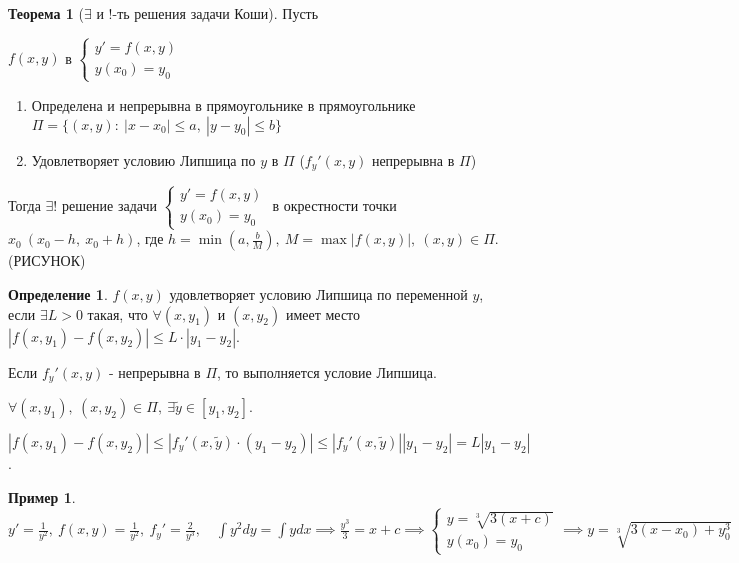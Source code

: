 \documentclass{report}
\theoremstyle{definition}
\newtheorem{definition}{Определение}[section]
\newtheorem{example}{Пример}
\newtheorem{theorem}{Теорема}[section]
\begin{document}
\begin{theorem}[$\exists$ и $!$-ть решения задачи Коши]
    Пусть
    \begin{center}
        $f(x,y)$ в $\left\{\begin{array}{l}
                y'=f(x,y) \\
                y(x_0) = y_0
            \end{array}\right.$
    \end{center}

    \begin{enumerate}
        \item Определена и непрерывна в прямоугольнике в прямоугольнике \\
              $\Pi = \{(x,y): \ |x - x_0| \leqslant a, \ |y - y_0| \leqslant b\}$
        \item Удовлетворяет условию Липшица по $y$ в $\Pi$ ($f_y'(x,y)$ непрерывна в $\Pi$)
    \end{enumerate}

    Тогда $\exists !$ решение задачи $\left\{\begin{array}{l}
            y'=f(x,y) \\
            y(x_0) = y_0
        \end{array}\right.$ в окрестности точки \\
    $x_0 \ (x_0 - h, \ x_0 + h)$, где $h = \min(a, \frac{b}{M}), \ M = \max|f(x,y)|, \ (x,y) \in \Pi$. (РИСУНОК)
\end{theorem}

\begin{definition}
    $f(x,y)$ удовлетворяет условию Липшица по переменной $y$, если $\exists L > 0$ такая, что $\forall (x,y_1)$ и $(x,y_2)$ имеет место $|f(x,y_1) - f(x,y_2)| \leqslant L \cdot|y_1 - y_2|$.

    Если $f_y'(x,y)$ - непрерывна в $\Pi$, то выполняется условие Липшица.

    $\forall (x,y_1), \ (x,y_2) \in \Pi, \ \exists \widetilde{y} \in [y_1,y_2]$.

    $|f(x,y_1) - f(x,y_2)| \leqslant |f_y'(x,\widetilde{y}) \cdot (y_1 - y_2)| \leqslant |f_y'(x,\widetilde{y})||y_1 - y_2| = L|y_1 - y_2|$.
\end{definition}

\begin{example}
    $y' = \frac{1}{y^2}, \ f(x,y) = \frac{1}{y^2}, \ f_y'=\frac{2}{y^3}, \quad \int y^2dy = \int ydx \implies \frac{y^3}{3} = x + c \implies
        \left\{\begin{array}{l}
            y = \sqrt[3]{3(x + c)} \\
            y(x_0) = y_0
        \end{array}\right. \implies y = \sqrt[3]{3(x-x_0) + y_0^3}$
\end{example}
\end{document}
